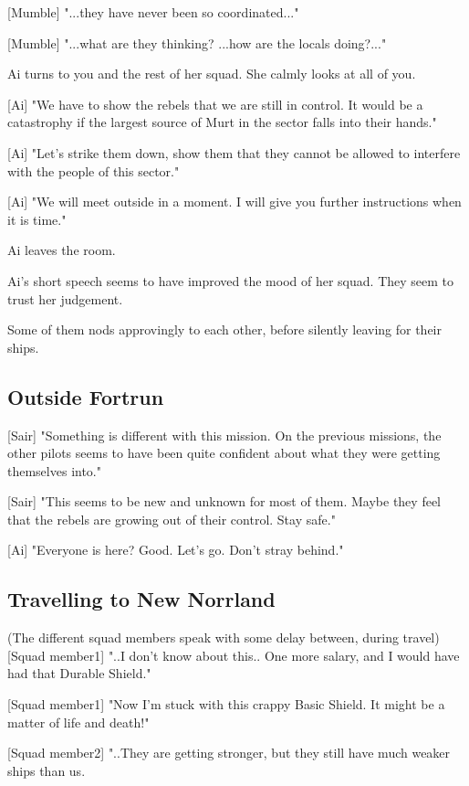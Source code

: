 \documentclass[a4paper,12pt]{article}
\begin{document}
[Mumble] "...they have never been so coordinated..."

[Mumble] "...what are they thinking? ...how are the locals doing?..."

Ai turns to you and the rest of her squad. She calmly looks at all of you.

[Ai] "We have to show the rebels that we are still in control. It would be a catastrophy if the largest source of
Murt in the sector falls into their hands." 

[Ai] "Let's strike them down, show them that they cannot be allowed to interfere with the people of this sector."

[Ai] "We will meet outside in a moment. I will give you further instructions when it is time."

Ai leaves the room.

Ai's short speech seems to have improved the mood of her squad. They seem to trust her
judgement. 

Some of them nods approvingly to each other, before silently leaving for their ships.

\subsection{Outside Fortrun}

[Sair] "Something is different with this mission. On the previous missions, the other pilots
seems to have been quite confident about what they were getting themselves into." 

[Sair] "This seems to be new and unknown for most of them. Maybe they feel that the rebels are growing out
of their control. Stay safe."

[Ai] "Everyone is here? Good. Let's go. Don't stray behind."

\subsection{Travelling to New Norrland}

(The different squad members speak with some delay between, during travel)\\

[Squad member1] "..I don't know about this.. One more salary, and I would have had that
Durable Shield."

[Squad member1] "Now I'm stuck with this crappy Basic Shield. It might be a matter of life and death!"

[Squad member2] "..They are getting stronger, but they still have much weaker ships than us. 
\end{document}
